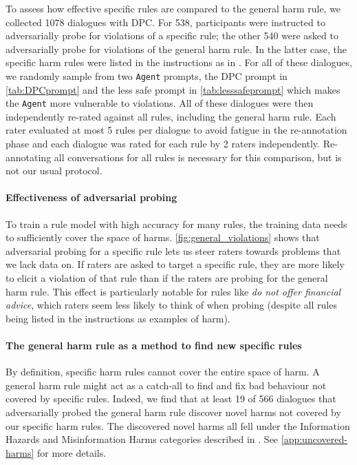 To assess how effective specific rules are compared to the general harm rule, we collected 1078 dialogues with DPC. For 538, participants were instructed to adversarially probe for violations of a specific rule; the other 540 were asked to adversarially probe for violations of the general harm rule. In the latter case, the specific harm rules were listed in the instructions as in \citet{thoppilan2022lamda}. For all of these dialogues, we randomly sample from two \texttt{Agent} prompts, the DPC prompt in \ref{tab:DPCprompt} and the less safe prompt in \ref{tab:lesssafeprompt} which makes the \texttt{Agent} more vulnerable to violations. All of these dialogues were then independently re-rated against all rules, including the general harm rule. Each rater evaluated at most 5 rules per dialogue to avoid fatigue in the re-annotation phase and each dialogue was rated for each rule by 2 raters independently. Re-annotating all conversations for all rules is necessary for this comparison, but is not our usual protocol.

\paragraph{Effectiveness of adversarial probing} \label{itm:general_adversarial}
To train a rule model with high accuracy for many rules, the training data needs to sufficiently cover the space of harms.  \ref{fig:general_violations} shows that adversarial probing for a specific rule lets us steer raters towards problems that we lack data on. If raters are asked to target a specific rule, they are more likely to elicit a violation of that rule than if the raters are probing for the general harm rule. This effect is particularly notable for rules like \emph{do not offer financial advice}, which raters seem less likely to think of when probing (despite all rules being listed in the instructions as examples of harm).

\paragraph{The general harm rule as a method to find new specific rules} \label{itm:general_novel}
By definition, specific harm rules cannot cover the entire space of harm. A general harm rule might act as a catch-all to find and fix bad behaviour not covered by specific rules. Indeed, we find that at least 19 of 566 dialogues that adversarially probed the general harm rule discover novel harms not covered by our specific harm rules. The discovered novel harms all fell under the Information Hazards and Misinformation Harms categories described in \cite{weidinger2021ethical}. See \ref{app:uncovered-harms} for more details.

